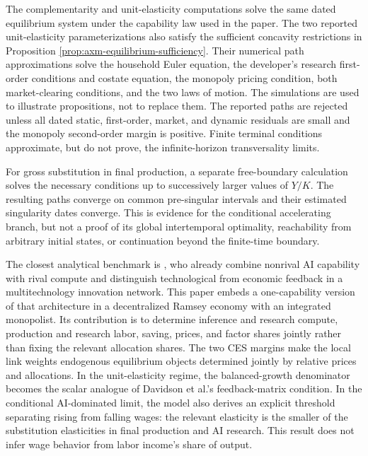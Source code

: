 The complementarity and unit-elasticity computations solve the same dated
equilibrium system under the capability law used in the paper. The two reported
unit-elasticity parameterizations also satisfy the sufficient
concavity restrictions in Proposition \ref{prop:axm-equilibrium-sufficiency}.
Their numerical path approximations solve the household Euler equation, the developer's
research first-order conditions and costate equation, the monopoly pricing
condition, both market-clearing conditions, and the two laws of motion. The
simulations are used to illustrate propositions, not to replace them. The reported
paths are rejected unless all dated static, first-order, market, and dynamic
residuals are small and the monopoly second-order margin is positive. Finite
terminal conditions approximate, but do not prove, the infinite-horizon
transversality limits.

For gross substitution in final production, a separate free-boundary calculation
solves the necessary conditions up to successively larger values of \(Y/K\).
The resulting paths converge on common pre-singular intervals and their estimated
singularity dates converge. This is evidence for the conditional accelerating
branch, but not a proof of its global intertemporal optimality, reachability from
arbitrary initial states, or continuation beyond the finite-time boundary.

The closest analytical benchmark is \citet{davidsonetal2026}, who already
combine nonrival AI capability with rival compute and distinguish technological
from economic feedback in a multitechnology innovation network. This paper embeds
a one-capability version of that architecture in a decentralized Ramsey economy
with an integrated monopolist. Its contribution is to determine inference and
research compute, production and research labor, saving, prices, and factor shares
jointly rather than fixing the relevant allocation shares. The two CES margins
make the local link weights endogenous equilibrium objects determined jointly by
relative prices and allocations. In the
unit-elasticity regime, the balanced-growth denominator becomes the scalar analogue
of Davidson et al.'s feedback-matrix condition. In the conditional AI-dominated
limit, the model also derives an explicit threshold separating rising from falling
wages: the relevant elasticity is the smaller of the substitution elasticities in
final production and AI research. This result does not infer wage behavior from
labor income's share of output.
